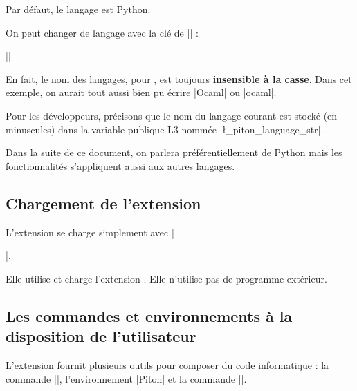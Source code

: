 \documentclass[dvipsnames,svgnames]{article}
\begin{document}
\smallskip
Par défaut, le langage est Python.

\smallskip
{}
On peut changer de langage avec la clé  de |\PitonOptions| : 

\smallskip
||

\smallskip
En fait, le nom des langages, pour , est toujours \textbf{insensible à la
  casse}. Dans cet exemple, on aurait tout aussi bien pu écrire |Ocaml| ou |ocaml|.

\smallskip
Pour les développeurs, précisons que le nom du langage courant est stocké (en minuscules)
dans la variable publique L3 nommée |\l_piton_language_str|.

\smallskip
Dans la suite de ce document, on parlera préférentiellement de Python mais les
fonctionnalités s'appliquent aussi aux autres langages.



\subsection{Chargement de l'extension}


L'extension  se charge simplement avec |\usepackage{piton}|.

\smallskip
Elle utilise et charge l'extension . Elle n'utilise pas de programme
extérieur. 

\subsection{Les commandes et environnements à la disposition de l'utilisateur}


L'extension  fournit plusieurs outils pour composer du code informatique : la
commande |\piton|, l'environnement |{Piton}| et la commande |\PitonInputFile|.
\end{document}

